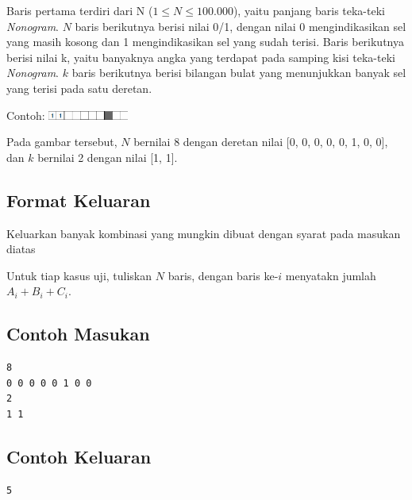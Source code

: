 \documentclass{article}
\begin{document}
Baris pertama terdiri dari N ($1 \leq N \leq 100.000$), yaitu panjang baris teka-teki \textit{Nonogram}.
$N$ baris berikutnya berisi nilai 0/1, dengan nilai 0 mengindikasikan sel yang masih kosong dan 1 mengindikasikan sel yang sudah terisi.
Baris berikutnya berisi nilai k, yaitu banyaknya angka yang terdapat pada samping kisi teka-teki \textit{Nonogram}.
$k$ baris berikutnya berisi bilangan bulat yang menunjukkan banyak sel yang terisi pada satu deretan.

Contoh:
\includegraphics[width=100px]{Homogram-Row}

Pada gambar tersebut, $N$ bernilai 8 dengan deretan nilai [0, 0, 0, 0, 0, 1, 0, 0], dan $k$ bernilai 2 dengan nilai [1, 1].

\subsection*{Format Keluaran}

Keluarkan banyak kombinasi yang mungkin dibuat dengan syarat pada masukan diatas

Untuk tiap kasus uji, tuliskan $N$ baris, dengan baris ke-$i$ menyatakn jumlah $A_i + B_i + C_i$.
\\

\begin{multicols}{2}
\subsection*{Contoh Masukan}
\begin{lstlisting}
8
0 0 0 0 0 1 0 0
2
1 1
\end{lstlisting}
\columnbreak
\subsection*{Contoh Keluaran}
\begin{lstlisting}
5
\end{lstlisting}
\vfill
\null
\end{multicols}

\pagebreak
\end{document}
